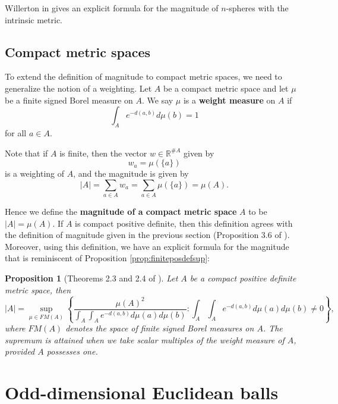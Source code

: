 \documentclass[11pt]{article}
\theoremstyle{mythm}
\newtheorem{prop}[defn]{Proposition}
\begin{document}
Willerton in \cite{willerton_magnitude_2014} gives an explicit formula for the magnitude of $n$-spheres with the intrinsic metric.

\subsection{Compact metric spaces}

To extend the definition of magnitude to compact metric spaces, we need to generalize the notion of a weighting. Let $A$ be a compact metric space and let $\mu$ be a finite signed Borel measure on $A$. We say $\mu$ is a \textbf{weight measure} on $A$ if
\begin{equation*}
\int_A e^{-d(a,b)}d\mu(b) = 1
\end{equation*}
for all $a \in A$.

Note that if $A$ is finite, then the vector $w \in \mathbb{R}^{\# A}$ given by
\begin{equation*}
w_a = \mu(\{a\})
\end{equation*}
is a weighting of $A$, and the magnitude is given by
\begin{equation*}
\vert A \vert = \sum\limits_{a\in A} w_a = \sum\limits_{a \in A} \mu(\{a\}) = \mu(A).
\end{equation*}

Hence we define the \textbf{magnitude of a compact metric space} $A$ to be $\vert A \vert = \mu(A)$. If $A$ is compact positive definite, then this definition agrees with the definition of magnitude given in the previous section (Proposition 3.6 of \cite{leinster_magnitude_2017}). Moreover, using this definition, we have an explicit formula for the magnitude that is reminiscent of Proposition \ref{prop:finiteposdefsup}:

\begin{prop}[Theorems 2.3 and 2.4 of \cite{meckes_positive_2013}]\label{prop:variationalformula}
Let $A$ be a compact positive definite metric space, then
\begin{equation*}
\vert A \vert = \sup\limits_{\mu \in FM(A)}\left\{\frac{\mu(A)^2}{\int_A \int_A e^{-d(a,b)}d\mu(a)d\mu(b)}: \int_A \int_A e^{-d(a,b)}d\mu(a)d\mu(b)\neq0\right\},
\end{equation*}
where $FM(A)$ denotes the space of finite signed Borel measures on $A$. The supremum is attained when we take scalar multiples of the weight measure of $A$, provided $A$ possesses one.
\end{prop}

\section{Odd-dimensional Euclidean balls}
\end{document}
